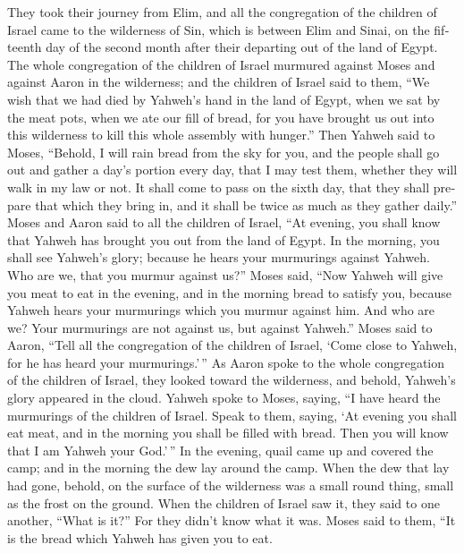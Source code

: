 \begin{paracol}{2}
\begin{otherlanguage}{english}
 They took their journey from Elim, and all the
congregation of the children of Israel came to the wilderness of Sin,
which is between Elim and Sinai, on the fifteenth day of the second
month after their departing out of the land of Egypt.  The
whole congregation of the children of Israel murmured against Moses and
against Aaron in the wilderness;  and the children of
Israel said to them, ``We wish that we had died by Yahweh's hand in the
land of Egypt, when we sat by the meat pots, when we ate our fill of
bread, for you have brought us out into this wilderness to kill this
whole assembly with hunger.''  Then Yahweh said to Moses,
``Behold, I will rain bread from the sky for you, and the people shall
go out and gather a day's portion every day, that I may test them,
whether they will walk in my law or not.  It shall come to
pass on the sixth day, that they shall prepare that which they bring in,
and it shall be twice as much as they gather daily.'' 
Moses and Aaron said to all the children of Israel, ``At evening, you
shall know that Yahweh has brought you out from the land of Egypt.
 In the morning, you shall see Yahweh's glory; because he
hears your murmurings against Yahweh. Who are we, that you murmur
against us?''  Moses said, ``Now Yahweh will give you meat
to eat in the evening, and in the morning bread to satisfy you, because
Yahweh hears your murmurings which you murmur against him. And who are
we? Your murmurings are not against us, but against Yahweh.''
 Moses said to Aaron, ``Tell all the congregation of the
children of Israel, `Come close to Yahweh, for he has heard your
murmurings.'\,''  As Aaron spoke to the whole
congregation of the children of Israel, they looked toward the
wilderness, and behold, Yahweh's glory appeared in the cloud.
 Yahweh spoke to Moses, saying,  ``I have
heard the murmurings of the children of Israel. Speak to them, saying,
`At evening you shall eat meat, and in the morning you shall be filled
with bread. Then you will know that I am Yahweh your God.'\,''
 In the evening, quail came up and covered the camp; and
in the morning the dew lay around the camp.  When the dew
that lay had gone, behold, on the surface of the wilderness was a small
round thing, small as the frost on the ground.  When the
children of Israel saw it, they said to one another, ``What is it?'' For
they didn't know what it was. Moses said to them, ``It is the bread
which Yahweh has given you to eat.


\end{otherlanguage}
\end{paracol}
